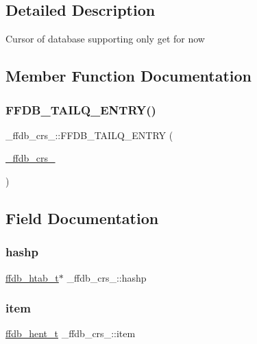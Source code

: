 \subsection{Detailed Description}
Cursor of database supporting only get for now 

\subsection{Member Function Documentation}
\mbox{\label{struct__ffdb__crs___ab69f088c55ed68ebc0cc2ed6342ef782}} 
\subsubsection{\texorpdfstring{FFDB\_TAILQ\_ENTRY()}{FFDB\_TAILQ\_ENTRY()}}
{\footnotesize\ttfamily \+\_\+ffdb\+\_\+crs\+\_\+\+::\+F\+F\+D\+B\+\_\+\+T\+A\+I\+L\+Q\+\_\+\+E\+N\+T\+RY (\begin{DoxyParamCaption}\item[{\mbox{\hyperlink{struct__ffdb__crs__}{\+\_\+ffdb\+\_\+crs\+\_\+}}}]{ }\end{DoxyParamCaption})}



\subsection{Field Documentation}
\mbox{\label{struct__ffdb__crs___a24de063362cf44602bfa5d56c9bae574}} 
\subsubsection{\texorpdfstring{hashp}{hashp}}
{\footnotesize\ttfamily \mbox{\hyperlink{ffdb__hash_8h_ae592010ed2bedc975d3cc0b7d074b9d1}{ffdb\+\_\+htab\+\_\+t}}$\ast$ \+\_\+ffdb\+\_\+crs\+\_\+\+::hashp}

\mbox{\label{struct__ffdb__crs___afa4e8bde8a789a61d3078df069fd70d1}} 
\subsubsection{\texorpdfstring{item}{item}}
{\footnotesize\ttfamily \mbox{\hyperlink{ffdb__hash_8h_aa1cea5ccbd6513ed152988f7a71a936d}{ffdb\+\_\+hent\+\_\+t}} \+\_\+ffdb\+\_\+crs\+\_\+\+::item}


